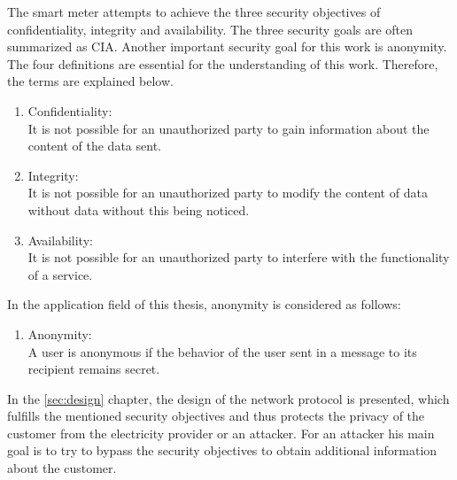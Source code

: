 The smart meter attempts to achieve the three security objectives of confidentiality, integrity and availability. The three security goals are often summarized as CIA. Another important security goal for this work is anonymity. The four definitions are essential for the understanding of this work. Therefore, the terms are explained below.
\begin{enumerate}
\item Confidentiality: \\
It is not possible for an unauthorized party to gain information about the content of the data sent.
\item Integrity:\\
It is not possible for an unauthorized party to modify the content of data without data without this being noticed.
\item Availability: \\
It is not possible for an unauthorized party to interfere with the functionality of a service.
\end{enumerate}
In the application field of this thesis, anonymity is considered as follows:
\begin{enumerate}[resume]
\item Anonymity:\\
A user is anonymous if the behavior of the user sent in a message to its recipient remains secret.
\end{enumerate}
In the \ref{sec:design} chapter, the design of the network protocol is presented, which fulfills the mentioned security objectives and thus protects the privacy of the customer from the electricity provider or an attacker. For an attacker his main goal is to try to bypass the security objectives to obtain additional information about the customer.
